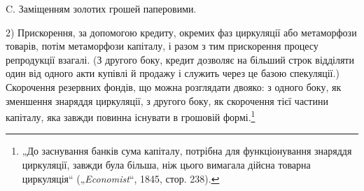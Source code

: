 C. Заміщенням золотих грошей паперовими.

2) Прискорення, за допомогою кредиту, окремих фаз циркуляції
або метаморфози товарів, потім метаморфози капіталу, і разом
з тим прискорення процесу репродукції взагалі. (З другого боку,
кредит дозволяє на більший строк відділяти один від одного акти
купівлі й продажу і служить через це базою спекуляції.) Скорочення резервних фондів, що можна
розглядати двояко: з одного
боку, як зменшення знаряддя циркуляції, з другого боку, як скорочення тієї частини капіталу, яка
завжди повинна існувати в грошовій формі.\footnote{„До заснування банків сума капіталу, потрібна для функціонування знаряддя циркуляції, завжди була
більша, ніж цього вимагала дійсна товарна
циркуляція“ („\emph{Economist}“, 1845, стор. 238).}
